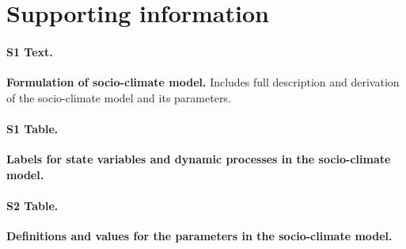 \documentclass[10pt,letterpaper]{article}
\begin{document}



\section*{Supporting information}

\paragraph*{S1 Text.}
\label{S1_text}
{\bf Formulation of socio-climate model.} Includes full description and derivation of the socio-climate model and its parameters.

\paragraph*{S1 Table.}
\label{S1_table}
{\bf Labels for state variables and dynamic processes in the socio-climate model.}

\paragraph*{S2 Table.}
\label{S2_table}
{\bf Definitions and values for the parameters in the socio-climate model.}
\end{document}
